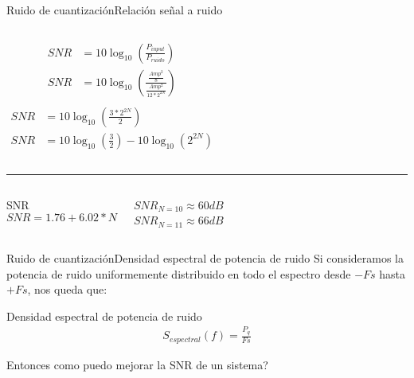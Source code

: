  \begin{frame}{Ruido de cuantización}{Relación señal a ruido}
    \begin{columns}[onlytextwidth]
       \begin{align*}
          SNR&=10 \log_{10} \left(\frac{P_{input}}{P_{ruido}} \right)\\
          SNR&=10 \log_{10}\left(\frac{\frac{Amp^2}{8}}{\frac{Amp^2}{12*2^{2N}}} \right) \\
       \end{align*}
       \begin{align*}
          SNR&=10 \log_{10}\left(\frac{3*2^{2N}}{2} \right)\\
          SNR&=10\log_{10}\left(\frac{3}{2}\right)-10\log_{10}\left(2^{2N}\right)
       \end{align*}
    \end{columns}
   \hrule
    \begin{columns}[c]
       \begin{block}{SNR}
          \begin{equation*}
             SNR = 1.76 + 6.02 * N
          \end{equation*}
       \end{block}
    \begin{center}
       {$SNR_{N=10} \approx 60dB$} \\
       {$SNR_{N=11} \approx 66dB$}
    \end{center}
    \end{columns}
    \vspace{3cm}
 \end{frame}
 \begin{frame}{Ruido de cuantización}{Densidad espectral de potencia de ruido}
    Si consideramos la potencia de ruido uniformemente distribuido en todo el espectro desde $-Fs$ hasta $+Fs$, nos queda que:
    \begin{block}{Densidad espectral de potencia de ruido}
       \begin{align*}
          S_{espectral}(f) = \frac{P_q}{Fs}
       \end{align*}
    \end{block}
    Entonces como puedo mejorar la SNR de un sistema?
    \vfill
 \end{frame}
